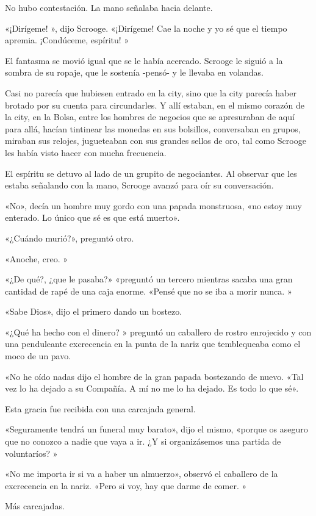 \documentclass{novela}
\begin{document}
 No hubo contestación. La mano señalaba hacia delante.

 «¡Dirígeme! », dijo Scrooge. «¡Dirígeme! Cae la noche y yo sé que el tiempo apremia. ¡Condúceme, espíritu! »

 El fantasma se movió igual que se le había acercado. Scrooge le siguió a la sombra de su ropaje, que le sostenía -pensó- y le llevaba en volandas.

 Casi no parecía que hubiesen entrado en la city, sino que la city parecía haber brotado por su cuenta para circundarles. Y allí estaban, en el mismo corazón de la city, en la Bolsa, entre los hombres de negocios que se apresuraban de aquí para allá, hacían tintinear las monedas en sus bolsillos, conversaban en grupos, miraban sus relojes, jugueteaban con sus grandes sellos de oro, tal como Scrooge les había visto hacer con mucha frecuencia.

 El espíritu se detuvo al lado de un grupito de negociantes. Al observar que les estaba señalando con la mano, Scrooge avanzó para oír su conversación.

 «No», decía un hombre muy gordo con una papada monstruosa, «no estoy muy enterado. Lo único que sé es que está muerto».

 «¿Cuándo murió?», preguntó otro.

 «Anoche, creo. »

 «¿De qué?, ¿que le pasaba?» «preguntó un tercero mientras sacaba una gran cantidad de rapé de una caja enorme. «Pensé que no se iba a morir nunca. »

 «Sabe Dios», dijo el primero dando un bostezo.

 «¿Qué ha hecho con el dinero? » preguntó un caballero de rostro enrojecido y con una penduleante excrecencia en la punta de la nariz que temblequeaba como el moco de un pavo.

 «No he oído nadas dijo el hombre de la gran papada bostezando de nuevo. «Tal vez lo ha dejado a su Compañía. A mí no me lo ha dejado. Es todo lo que sé».

 Esta gracia fue recibida con una carcajada general.

 «Seguramente tendrá un funeral muy barato», dijo el mismo, «porque os aseguro que no conozco a nadie que vaya a ir. ¿Y si organizásemos una partida de voluntaríos? »

 «No me importa ir si va a haber un almuerzo», observó el caballero de la excrecencia en la nariz. «Pero si voy, hay que darme de comer. »

 Más carcajadas.
\end{document}
